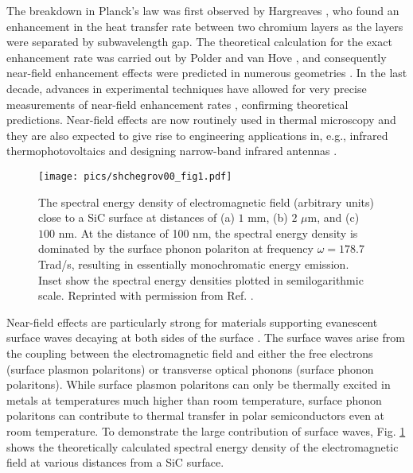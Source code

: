 The breakdown in Planck's law was first observed by Hargreaves \cite{hargreaves69}, who found an enhancement in the heat transfer rate between two chromium layers as the layers were separated by subwavelength gap. The theoretical calculation for the exact enhancement rate was carried out by Polder and van Hove \cite{polder71}, and consequently near-field enhancement effects were predicted in numerous geometries \cite{loomis94,pendry99,carminati99,shchegrov00,mulet01,volokitin01}. In the last decade, advances in experimental techniques have allowed for very precise measurements of near-field enhancement rates \cite{kittel05,hu08,shen09,ottens11}, confirming theoretical predictions. Near-field effects are now routinely used in thermal microscopy \cite{majumdar99,muller-hirsch99,kittel05,kittel08} and they are also expected to give rise to engineering applications in, e.g., infrared thermophotovoltaics \cite{dimatteo01,narayanaswamy03,laroche06} and designing narrow-band infrared antennas \cite{greffet02}. 

\begin{figure}
\begin{center}
 \texttt{[image: pics/shchegrov00\_fig1.pdf]}
 \caption{The spectral energy density of electromagnetic field (arbitrary units) close to a SiC surface at distances of (a) $1$ mm, (b) $2$ $\mu$m, and (c) $100$ nm. At the distance of 100 nm, the spectral energy density is dominated by the surface phonon polariton at frequency $\omega=178.7$ Trad/s, resulting in essentially monochromatic energy emission. Inset show the spectral energy densities plotted in semilogarithmic scale. Reprinted with permission from Ref. \cite{shchegrov00}.}
\label{fig:intro_shchegrov}
\end{center}
\end{figure} 

Near-field effects are particularly strong for materials supporting evanescent surface waves decaying at both sides of the surface \cite{shchegrov00}. The surface waves arise from the coupling between the electromagnetic field and either the free electrons (surface plasmon polaritons) or transverse optical phonons (surface phonon polaritons). While surface plasmon polaritons can only be thermally excited in metals at temperatures much higher than room temperature, surface phonon polaritons can contribute to thermal transfer in polar semiconductors even at room temperature. To demonstrate the large contribution of surface waves, Fig. \ref{fig:intro_shchegrov} shows the theoretically calculated \cite{shchegrov00} spectral energy density of the electromagnetic field at various distances from a SiC surface.


